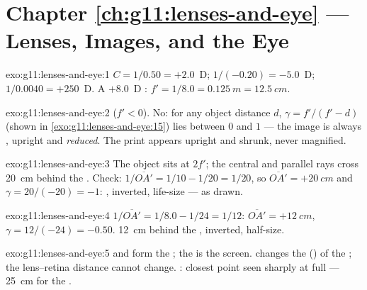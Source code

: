 \section*{Chapter \ref{ch:g11:lenses-and-eye} --- Lenses, Images, and the Eye}

\begin{solution}{exo:g11:lenses-and-eye:1}
$C = 1/0.50 = +2.0$~D; $1/(-0.20) = -5.0$~D; $1/0.0040 = +250$~D.
A $+8.0$~D : $f' = 1/8.0 = \qty{0.125}{m} = \qty{12.5}{cm}$.
\end{solution}

\begin{solution}{exo:g11:lenses-and-eye:2}
 ($f' < 0$). No: for any object distance $d$,
$\gamma = f'/(f' - d)$ (shown in \cref{exo:g11:lenses-and-eye:15})
lies between $0$ and $1$ --- the image is
always , upright and \emph{reduced}. The print appears upright
and shrunk, never magnified.
\end{solution}

\begin{solution}{exo:g11:lenses-and-eye:3}
The object sits at $2f'$; the central and parallel rays cross
\qty{20}{cm} behind the . Check:
$1/\overline{OA'} = 1/10 - 1/20 = 1/20$, so
$\overline{OA'} = +\qty{20}{cm}$ and $\gamma = 20/(-20) = -1$: ,
inverted, life-size --- as drawn.
\end{solution}

\begin{solution}{exo:g11:lenses-and-eye:4}
$1/\overline{OA'} = 1/8.0 - 1/24 = 1/12$:
$\overline{OA'} = +\qty{12}{cm}$, $\gamma = 12/(-24) = -0.50$.  \qty{12}{cm} behind the , inverted, half-size.
\end{solution}

\begin{solution}{exo:g11:lenses-and-eye:5}
 and  form the ; the  is
the screen.  changes the  () of the
; the lens--retina distance cannot change. : closest point seen sharply at full  ---
\qty{25}{cm} for the .
\end{solution}

